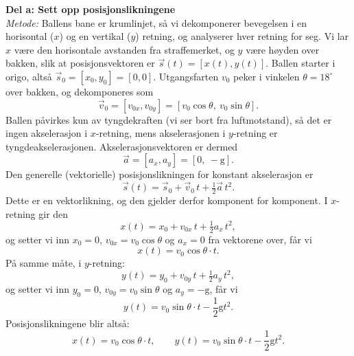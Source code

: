 {\begin{center}
    \label{fig:straffespark}
    \end{center}

    \textbf{Del a: Sett opp posisjonslikningene} \\

    \textit{Metode:}
    Ballens bane er krumlinjet, så vi dekomponerer bevegelsen i en horisontal ($x$) og en vertikal ($y$) retning, og analyserer hver retning for seg. Vi lar $x$ være den horisontale avstanden fra straffemerket, og $y$ være høyden over bakken, slik at posisjonsvektoren er $\vec{s}(t) = [x(t), y(t)]$. Ballen starter i origo, altså $\vec{s}_0 = [x_0, y_0] = [0, 0]$. Utgangsfarten $v_0$ peker i vinkelen $\theta = 18^\circ$ over bakken, og dekomponeres som
    \[
    \vec{v}_0 = [v_{0x}, v_{0y}] = [v_0\cos\theta,\ v_0\sin\theta].
    \]
    Ballen påvirkes kun av tyngdekraften (vi ser bort fra luftmotstand), så det er ingen akselerasjon i $x$-retning, mens akselerasjonen i $y$-retning er tyngdeakselerasjonen. Akselerasjonsvektoren er dermed
    \[
    \vec{a} = [a_x, a_y] = [0,\ -\mathrm{g}].
    \]
    Den generelle (vektorielle) posisjonslikningen for konstant akselerasjon er
    \[
    \vec{s}(t) = \vec{s}_0 + \vec{v}_0\,t + \tfrac{1}{2}\vec{a}\,t^2.
    \]
    Dette er en vektorlikning, og den gjelder derfor komponent for komponent. I $x$-retning gir den
    \[
    x(t) = x_0 + v_{0x}\,t + \tfrac{1}{2}a_x\,t^2,
    \]
    og setter vi inn $x_0 = 0$, $v_{0x} = v_0\cos\theta$ og $a_x = 0$ fra vektorene over, får vi
    \[
    x(t) = v_0 \cos\theta \cdot t.
    \]
    På samme måte, i $y$-retning:
    \[
    y(t) = y_0 + v_{0y}\,t + \tfrac{1}{2}a_y\,t^2,
    \]
    og setter vi inn $y_0 = 0$, $v_{0y} = v_0\sin\theta$ og $a_y = -\mathrm{g}$, får vi
    \[
    y(t) = v_0 \sin\theta \cdot t - \frac{1}{2} \mathrm{g} t^2.
    \]
    Posisjonslikningene blir altså:
    \[
    x(t) = v_0 \cos\theta \cdot t, \qquad y(t) = v_0 \sin\theta \cdot t - \frac{1}{2} \mathrm{g} t^2.
    \]

}
